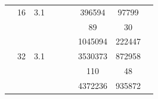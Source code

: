 \begin{table}[htbp]
\begin{tabular}{l S[table-format=3.0] S[table-format=4.1] l S[table-format=6.0] S[table-format=6.0] S[table-format=6.0] S[table-format=5.0] S[table-format=2.0]}
     & 16 & 3.1 &  & {\text{---}} & {\text{---}} & 396594 & 97799 & {\text{---}} \\
     &  &  &  & {\text{---}} & {\text{---}} & 89 & 30 & {\text{---}} \\
     &  &  &  & {\text{---}} & {\text{---}} & 1045094 & 222447 & {\text{---}} \\
     & 32 & 3.1 &  & {\text{---}} & {\text{---}} & 3530373 & 872958 & {\text{---}} \\
     &  &  &  & {\text{---}} & {\text{---}} & 110 & 48 & {\text{---}} \\
     &  &  &  & {\text{---}} & {\text{---}} & 4372236 & 935872 & {\text{---}} \\
    \bottomrule
  \end{tabular}
\end{table}
